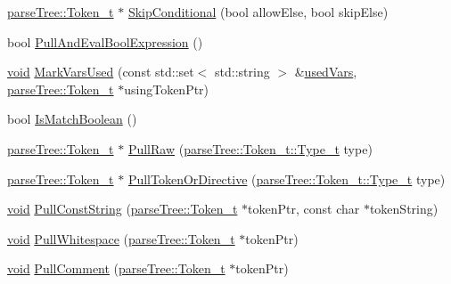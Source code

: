 \begin{DoxyCompactItemize}
\item 
\hyperlink{structparse_tree_1_1_token__t}{parse\+Tree\+::\+Token\+\_\+t} $\ast$ \hyperlink{classparser_1_1_lexer__t_a3de63e7ae7038f39c500042dc9aebe4e}{Skip\+Conditional} (bool allow\+Else, bool skip\+Else)
\item 
bool \hyperlink{classparser_1_1_lexer__t_a2d1b3b0db5dc5eb040991c27e359f6ae}{Pull\+And\+Eval\+Bool\+Expression} ()
\item 
\hyperlink{_t_e_m_p_l_a_t_e__cdef_8h_ac9c84fa68bbad002983e35ce3663c686}{void} \hyperlink{classparser_1_1_lexer__t_a9ca02eebc0abe9c0877c44772cd59265}{Mark\+Vars\+Used} (const std\+::set$<$ std\+::string $>$ \&\hyperlink{classparser_1_1_lexer__t_a1bc0d9834fc7e2824dc22957ab9c3ad6}{used\+Vars}, \hyperlink{structparse_tree_1_1_token__t}{parse\+Tree\+::\+Token\+\_\+t} $\ast$using\+Token\+Ptr)
\item 
bool \hyperlink{classparser_1_1_lexer__t_a9f56b93b06b20371543eee7bc0bb4d90}{Is\+Match\+Boolean} ()
\item 
\hyperlink{structparse_tree_1_1_token__t}{parse\+Tree\+::\+Token\+\_\+t} $\ast$ \hyperlink{classparser_1_1_lexer__t_ae36057080263b7637fa2742fbb762997}{Pull\+Raw} (\hyperlink{structparse_tree_1_1_token__t_ac0e6319a9ad80509dd4aa1037ba66096}{parse\+Tree\+::\+Token\+\_\+t\+::\+Type\+\_\+t} type)
\item 
\hyperlink{structparse_tree_1_1_token__t}{parse\+Tree\+::\+Token\+\_\+t} $\ast$ \hyperlink{classparser_1_1_lexer__t_a66e20b7cbb45b05b51c1c8176d65d318}{Pull\+Token\+Or\+Directive} (\hyperlink{structparse_tree_1_1_token__t_ac0e6319a9ad80509dd4aa1037ba66096}{parse\+Tree\+::\+Token\+\_\+t\+::\+Type\+\_\+t} type)
\item 
\hyperlink{_t_e_m_p_l_a_t_e__cdef_8h_ac9c84fa68bbad002983e35ce3663c686}{void} \hyperlink{classparser_1_1_lexer__t_a271c290aa5212d3b19c5f92307e84964}{Pull\+Const\+String} (\hyperlink{structparse_tree_1_1_token__t}{parse\+Tree\+::\+Token\+\_\+t} $\ast$token\+Ptr, const char $\ast$token\+String)
\item 
\hyperlink{_t_e_m_p_l_a_t_e__cdef_8h_ac9c84fa68bbad002983e35ce3663c686}{void} \hyperlink{classparser_1_1_lexer__t_af053641d6b967e0922bfbd9304e3162c}{Pull\+Whitespace} (\hyperlink{structparse_tree_1_1_token__t}{parse\+Tree\+::\+Token\+\_\+t} $\ast$token\+Ptr)
\item 
\hyperlink{_t_e_m_p_l_a_t_e__cdef_8h_ac9c84fa68bbad002983e35ce3663c686}{void} \hyperlink{classparser_1_1_lexer__t_afad4c713158aa2532ac3864606c4ff52}{Pull\+Comment} (\hyperlink{structparse_tree_1_1_token__t}{parse\+Tree\+::\+Token\+\_\+t} $\ast$token\+Ptr)

\end{DoxyCompactItemize}
